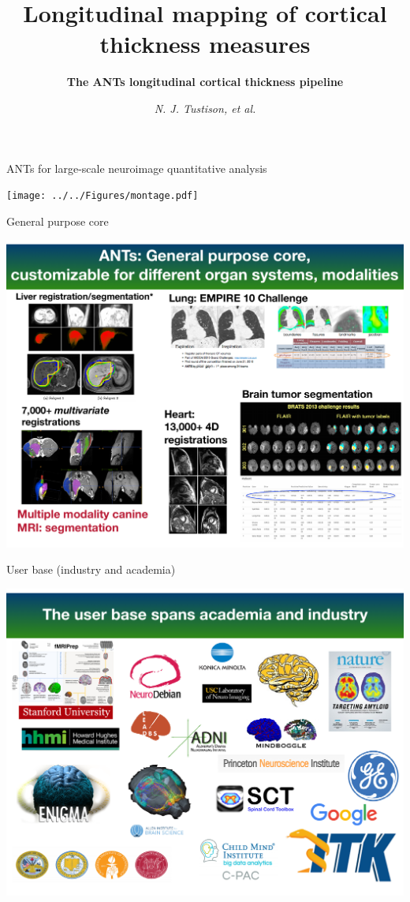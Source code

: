 \documentclass[ignorenonframetext,]{beamer}
\institute{UVa/UCI}
\title{\textbf{Longitudinal mapping of cortical thickness measures}}
\subtitle{\textbf{The ANTs longitudinal cortical thickness pipeline}}
\author{\emph{N. J. Tustison, et al.}}
\date{}
\begin{document}
\frame{\titlepage}

\begin{frame}{ANTs for large-scale neuroimage quantitative analysis}

\vspace*{-.225cm} \hspace*{-.5cm}
\texttt{[image: ../../Figures/montage.pdf]}

\end{frame}

\begin{frame}{General purpose core}

\vspace*{-.225cm} \hspace*{-.5cm}
\includegraphics[width=1.07\textwidth,height=0.92\textheight]{../../Figures/antsGeneralPurpose.pdf}

\end{frame}

\begin{frame}{User base (industry and academia)}

\vspace*{-.225cm} \hspace*{-.5cm}
\includegraphics[width=1.07\textwidth,height=0.92\textheight]{../../Figures/userbase.pdf}

\end{frame}
\end{document}
